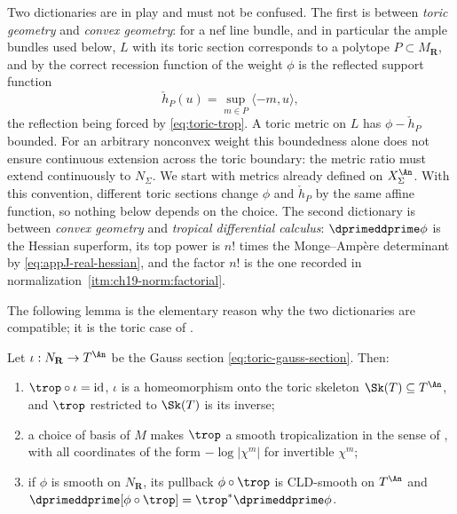Two dictionaries are in play and must not be confused.  The first is between
\emph{toric geometry} and \emph{convex geometry}: for a nef line bundle,
and in particular the ample bundles used below, $L$ with
its toric section corresponds to a polytope $P\subset M_{\mathbf R}$, and
by  the correct recession function of the weight
$\phi$ is the reflected support function
\[
 \check h_P(u)=\sup_{m\in P}\langle-m,u\rangle,
\]
the reflection being forced by \eqref{eq:toric-trop}.  A toric metric on
$L$ has $\phi-\check h_P$ bounded.  For an arbitrary nonconvex weight this
boundedness alone does not ensure continuous extension across the toric
boundary: the metric ratio must extend continuously to $N_\Sigma$.  We
start with metrics already defined on $X_\Sigma^{\An}$.  With this convention,
different toric sections change $\phi$ and $\check h_P$ by the same
affine function, so nothing below depends on the choice.  The second
dictionary is between \emph{convex geometry} and \emph{tropical differential
calculus}: $\dprimeddprime\phi$ is the Hessian superform, its top power is
$n!$ times the Monge--Amp\`ere determinant by
\eqref{eq:appJ-real-hessian}, and the factor $n!$ is the one recorded in
normalization~\cref{itm:ch19-norm:factorial}.

The following lemma is the elementary reason why the two dictionaries are
compatible; it is the toric case of .

\begin{lemma}
\label{lem:ch19-toric-chart}
Let $\iota:N_{\mathbf R}\to T^{\An}$ be the Gauss section
\eqref{eq:toric-gauss-section}.  Then:
\begin{enumerate}
\item $\trop\circ\iota=\operatorname{id}$, $\iota$ is a homeomorphism onto the toric
 skeleton $\Sk(T)\subseteq T^{\An}$, and $\trop$ restricted to
 $\Sk(T)$ is its inverse;
\item a choice of basis of $M$ makes $\trop$ a smooth tropicalization
 in the sense of , with all coordinates
 of the form $-\log|\chi^{m}|$ for invertible $\chi^m$;
\item if $\phi$ is smooth on $N_{\mathbf R}$, its pullback
 $\phi\circ\trop$ is CLD-smooth on $T^{\An}$ and
 $\dprimeddprime[\phi\circ\trop]=\trop^*\dprimeddprime\phi$.
\end{enumerate}
\end{lemma}

